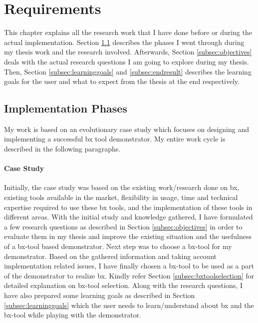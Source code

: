 \section{Requirements}\label{sec:requirements}
This chapter explains all the research work that I have done before or during the actual implementation. Section \ref{subsec:implementationphases} describes the phases I went through during my thesis work and the research involved. Afterwards, Section \ref{subsec:objectives} deals with the actual research questions I am going to explore during my thesis. Then, Section \ref{subsec:learninggoals} and \ref{subsec:endresult} describes the learning goals for the user and what to expect from the thesis at the end respectively. 

\subsection{Implementation Phases}\label{subsec:implementationphases}
My work is based on an \ac{evolutionary case study} which focuses on designing and implementing a successful bx tool demonstrator. My entire work cycle is described in the following paragraphs.
\paragraph{Case Study}
Initially, the case study was based on the existing work/research done on bx, existing tools available in the market, flexibility in usage, time and technical expertise required to use these bx tools, and the implementation of these tools in different areas. With the initial study and knowledge gathered, I have formulated a few research questions as described in Section \ref{subsec:objectives} in order to evaluate them in my thesis and improve the existing situation and the usefulness of a bx-tool based demonstrator. 
\newline\newline Next step was to choose a bx-tool for my demonstrator. Based on the gathered information and taking account implementation related issues, I have finally chosen a bx-tool to be used as a part of the demonstrator to realize bx. Kindly refer Section \ref{subsec:bxtoolselection} for detailed explanation on bx-tool selection.
\newline\newline Along with the research questions, I have also prepared some learning goals as described in Section \ref{subsec:learninggoals} which the user needs to learn/understand about bx and the bx-tool while playing with the demonstrator.
